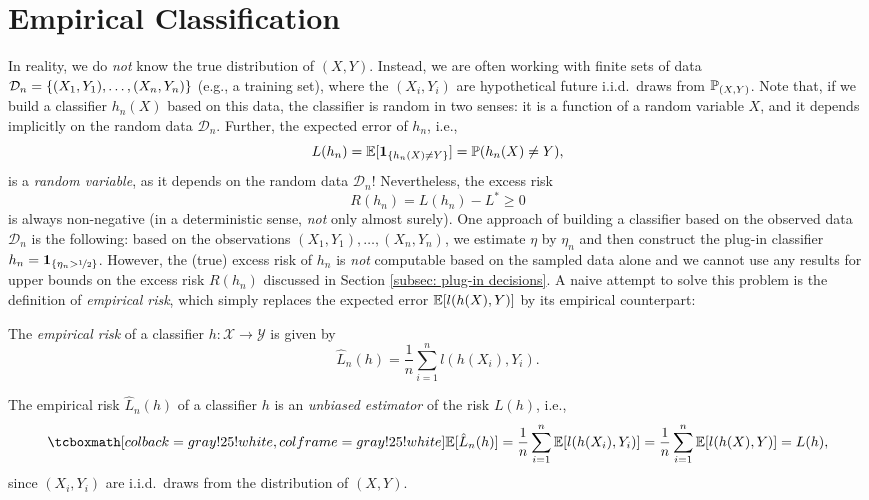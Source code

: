 \section{Empirical Classification}
\label{subsec: empirical classification}

In reality, we do \emph{not} know the true distribution of $(X, Y)$. Instead, we are often working with finite sets of data $\mathcal{D}_n = \set{(X_1, Y_1), \dots, (X_n, Y_n)}$ (e.g., a training set), where the $(X_i, Y_i)$ are hypothetical future i.i.d.\ draws from $\P_{(X, Y)}$. Note that, if we build a classifier $h_n(X)$ based on this data, the classifier is random in two senses: it is a function of a random variable $X$, and it depends implicitly on the random data $\mathcal{D}_n$. Further, the expected error of $h_n$, i.e.,
\[
    L(h_n) = \Exp[\indSet{h_n(X) \neq Y}] = \Prob(h_n(X) \neq Y),
\]
is a \emph{random variable}, as it depends on the random data $\mathcal{D}_n$! Nevertheless, the excess risk
\[
    R(h_n) = L(h_n) - L^* \geq 0
\]
is always non-negative (in a deterministic sense, \emph{not} only almost surely). One approach of building a classifier based on the observed data $\mathcal{D}_n$ is the following: based on the observations $(X_1, Y_1), \dots, (X_n, Y_n)$, we estimate $\eta$ by $\eta_n$ and then construct the plug-in classifier $h_n = \indSet{\eta_n > \nicefrac{1}{2}}$. However, the (true) excess risk of $h_n$ is \emph{not} computable based on the sampled data alone and we cannot use any results for upper bounds on the excess risk $R(h_n)$ discussed in Section \ref{subsec: plug-in decisions}. A naive attempt to solve this problem is the definition of \emph{empirical risk}, which simply replaces the expected error $\Exp[l(h(X), Y)]$ by its empirical counterpart:

\begin{definition}
The \emph{empirical risk} of a classifier $h \colon \mathcal{X} \to \mathcal{Y}$ is given by
\[
    \hat L_n(h) = \frac{1}{n} \sum_{i=1}^n l(h(X_i), Y_i).
\]
\end{definition}

The empirical risk $\hat L_n(h)$ of a classifier $h$ is an \emph{unbiased estimator} of the  risk $L(h)$, i.e.,
\begin{equation}
\label{eq: bias of empirical risk}
    \highlightMath{
        \Exp[\hat{L}_n(h)] = \frac{1}{n} \sum_{i=1}^n \Exp[l(h(X_i), Y_i)] = \frac{1}{n} \sum_{i=1}^n \Exp[l(h(X), Y)] = L(h),
    }
\end{equation}
since $(X_i, Y_i)$ are i.i.d.\ draws from the distribution of $(X, Y)$.

